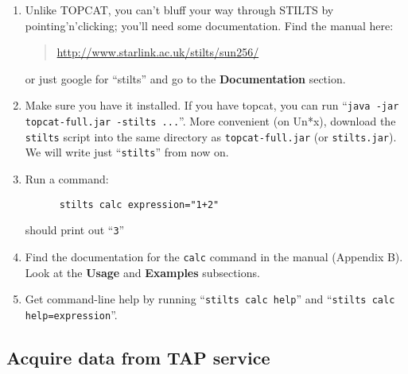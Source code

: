 \documentclass{article}
\newcommand{\lab}[1]{{\bf #1}}
\newcommand{\turl}[1]{{\color{blue}\url{#1}}}
\begin{document}
\begin{enumerate}
\item Unlike TOPCAT, you can't bluff your way through STILTS
      by pointing'n'clicking; you'll need some documentation.
      Find the manual here:
      \begin{quote}
        \turl{http://www.starlink.ac.uk/stilts/sun256/}
      \end{quote}
      or just google for ``stilts'' and go to the \lab{Documentation} section.
\item Make sure you have it installed.  If you have topcat, you can
      run ``{\tt java -jar topcat-full.jar -stilts ...}''.
      More convenient (on Un*x), download the {\tt stilts} script
      into the same directory as {\tt topcat-full.jar} (or {\tt stilts.jar}).
      We will write just ``{\tt stilts}'' from now on.
\item Run a command:
      \vspace*{-2ex}
      \begin{verbatim}
      stilts calc expression="1+2"
      \end{verbatim}
      \vspace*{-4ex}
      should print out ``{\tt 3}''
\item Find the documentation for the {\tt calc} command in the manual
      (Appendix B).
      Look at the \lab{Usage} and \lab{Examples} subsections.
\item Get command-line help by running ``{\tt stilts calc help}'' and
      ``{\tt stilts calc help=expression}''.
\end{enumerate}

\subsection{Acquire data from TAP service}
\end{document}
